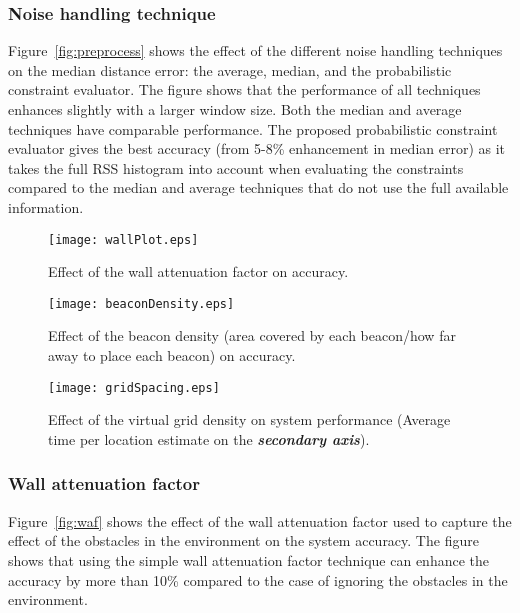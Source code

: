\documentclass[conference]{IEEEtran}
\begin{document}
\subsubsection{Noise handling technique}

Figure~\ref{fig:preprocess} shows the effect of the different noise handling techniques on the median distance error: the average, median, and the probabilistic constraint evaluator. The figure shows that the performance of all techniques enhances slightly with a larger window size. Both the median and average techniques have comparable performance. The proposed probabilistic constraint evaluator gives the best accuracy (from 5-8\% enhancement in median error) as it takes the full RSS histogram into account when evaluating the constraints compared to the median and average techniques that do not use the full available information.

\begin{figure*}[!t]
\noindent\begin{minipage}[t]{0.3\linewidth}
\centering
\texttt{[image: wallPlot.eps]}
\caption{Effect of the wall attenuation factor on accuracy.}
\label{fig:waf}
\end{minipage}
\hfill
\begin{minipage}[t]{0.3\linewidth}
\centering
\texttt{[image: beaconDensity.eps]}
\caption{Effect of the beacon density (area covered by each beacon/how far away to place each beacon) on accuracy.}
\label{fig:b_density}
\end{minipage}
\hfill
\begin{minipage}[t]{0.3\linewidth}
\centering
\texttt{[image: gridSpacing.eps]}
\caption{Effect of the virtual grid density on system performance (Average time per location estimate on the \textbf{\emph{secondary axis}}).}
\label{fig:vgrid}
\end{minipage}
\end{figure*}

\subsubsection{Wall attenuation factor}
Figure~\ref{fig:waf} shows the effect of the wall attenuation factor used to capture the effect of the 
obstacles in the environment on the system accuracy. The figure shows that using the simple wall attenuation factor technique can enhance the accuracy by more than 10\% compared to the case of ignoring the obstacles in the environment.
\end{document}
